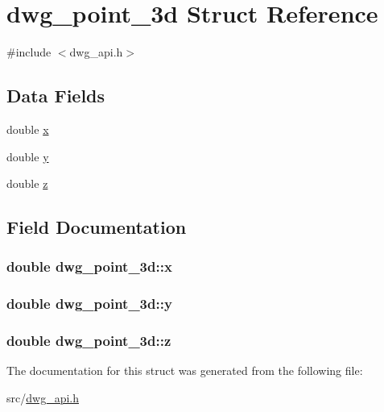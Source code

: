 \hypertarget{structdwg__point__3d}{\section{dwg\-\_\-point\-\_\-3d \-Struct \-Reference}
\label{structdwg__point__3d}
}


{\ttfamily \#include $<$dwg\-\_\-api.\-h$>$}

\subsection*{\-Data \-Fields}
\begin{DoxyCompactItemize}
\item 
double \hyperlink{structdwg__point__3d_a4614c09961d224c69aecb6078f117873}{x}
\item 
double \hyperlink{structdwg__point__3d_a62320ddef0650644bb7c56530ddca741}{y}
\item 
double \hyperlink{structdwg__point__3d_aa95977ab6579f780af1b59d9f7b92f05}{z}
\end{DoxyCompactItemize}


\subsection{\-Field \-Documentation}
\hypertarget{structdwg__point__3d_a4614c09961d224c69aecb6078f117873}{
\subsubsection[{x}]{\setlength{\rightskip}{0pt plus 5cm}double {\bf dwg\-\_\-point\-\_\-3d\-::x}}}\label{structdwg__point__3d_a4614c09961d224c69aecb6078f117873}
\hypertarget{structdwg__point__3d_a62320ddef0650644bb7c56530ddca741}{
\subsubsection[{y}]{\setlength{\rightskip}{0pt plus 5cm}double {\bf dwg\-\_\-point\-\_\-3d\-::y}}}\label{structdwg__point__3d_a62320ddef0650644bb7c56530ddca741}
\hypertarget{structdwg__point__3d_aa95977ab6579f780af1b59d9f7b92f05}{
\subsubsection[{z}]{\setlength{\rightskip}{0pt plus 5cm}double {\bf dwg\-\_\-point\-\_\-3d\-::z}}}\label{structdwg__point__3d_aa95977ab6579f780af1b59d9f7b92f05}


\-The documentation for this struct was generated from the following file\-:\begin{DoxyCompactItemize}
\item 
src/\hyperlink{dwg__api_8h}{dwg\-\_\-api.\-h}\end{DoxyCompactItemize}
